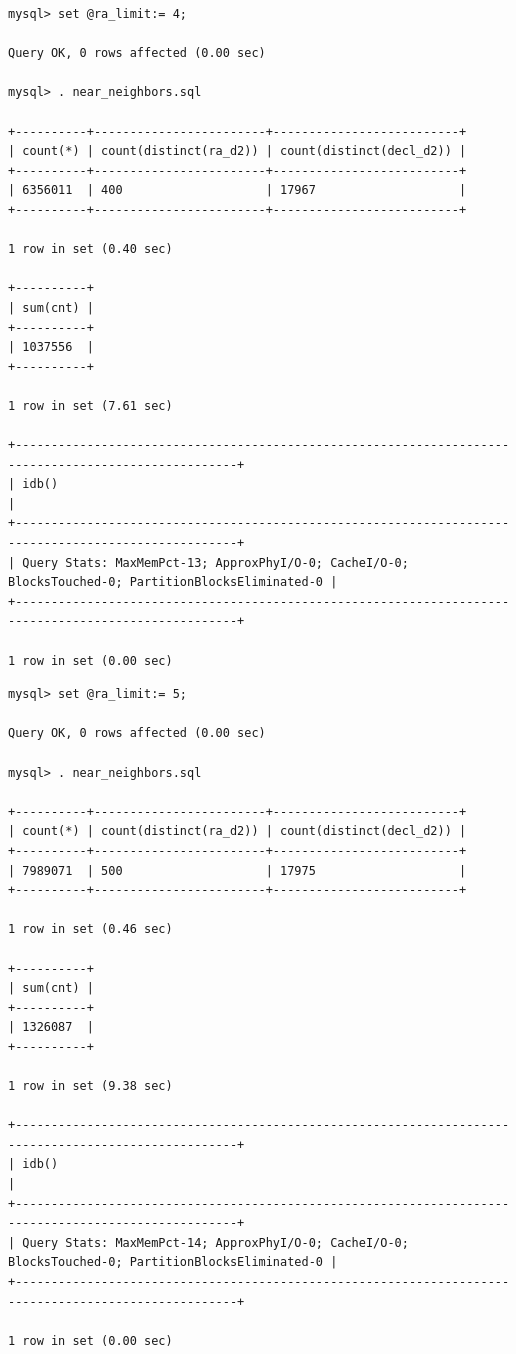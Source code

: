 \documentclass[DM,lsstdraft,toc]{lsstdoc}
\begin{document}
\begin{verbatim}
mysql> set @ra_limit:= 4;

Query OK, 0 rows affected (0.00 sec)

mysql> . near_neighbors.sql

+----------+------------------------+--------------------------+
| count(*) | count(distinct(ra_d2)) | count(distinct(decl_d2)) |
+----------+------------------------+--------------------------+
| 6356011  | 400                    | 17967                    |
+----------+------------------------+--------------------------+

1 row in set (0.40 sec)

+----------+
| sum(cnt) |
+----------+
| 1037556  |
+----------+

1 row in set (7.61 sec)

+-----------------------------------------------------------------------------------------------------+
| idb()                                                                                               |
+-----------------------------------------------------------------------------------------------------+
| Query Stats: MaxMemPct-13; ApproxPhyI/O-0; CacheI/O-0; BlocksTouched-0; PartitionBlocksEliminated-0 |
+-----------------------------------------------------------------------------------------------------+

1 row in set (0.00 sec)
\end{verbatim}

\begin{verbatim}
mysql> set @ra_limit:= 5;

Query OK, 0 rows affected (0.00 sec)

mysql> . near_neighbors.sql

+----------+------------------------+--------------------------+
| count(*) | count(distinct(ra_d2)) | count(distinct(decl_d2)) |
+----------+------------------------+--------------------------+
| 7989071  | 500                    | 17975                    |
+----------+------------------------+--------------------------+

1 row in set (0.46 sec)

+----------+
| sum(cnt) |
+----------+
| 1326087  |
+----------+

1 row in set (9.38 sec)

+-----------------------------------------------------------------------------------------------------+
| idb()                                                                                               |
+-----------------------------------------------------------------------------------------------------+
| Query Stats: MaxMemPct-14; ApproxPhyI/O-0; CacheI/O-0; BlocksTouched-0; PartitionBlocksEliminated-0 |
+-----------------------------------------------------------------------------------------------------+

1 row in set (0.00 sec)
\end{verbatim}
\end{document}
